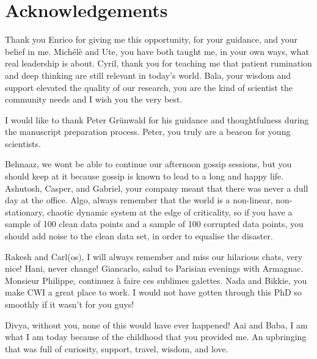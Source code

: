\chapter*{Acknowledgements}\label{chapter:preface}

Thank you Enrico for giving me this opportunity, for your guidance, and your 
belief in me. Mich\'el\`e and Ute, you have both taught me, in your own ways, 
what real leadership is about. Cyril, thank you for teaching me that patient 
rumination and deep thinking are still relevant in today's world. Bala, 
your wisdom and support elevated the quality of our research, you are 
the kind of scientist the community needs and I wish you the very best.

I would like to thank Peter Gr\"{u}nwald for his guidance and thoughtfulness 
during the manuscript preparation process. Peter, you truly are a beacon for 
young scientists. 

Behnaaz, we wont be able to continue our afternoon gossip sessions, but you 
should keep at it because gossip is known to lead to a long and happy life. 
Ashutosh, Casper, and Gabriel, your company meant that there was never a dull 
day at the office. Algo, always remember that the world is a non-linear, 
non-stationary, chaotic dynamic system at the edge of criticality, so if 
you have a sample of 100 clean data points and a sample of 100 corrupted data 
points, you should add noise to the clean data set, in order to equalise the 
disaster.

Rakesh and Carl(os), I will always remember and miss our hilarious chats, very 
nice! Hani, never change! Giancarlo, salud to Parisian evenings with Armagnac. 
Monsieur Philippe, continuez \`a faire ces sublimes galettes.
%
Nada and Bikkie, you make CWI a great place to work. I would not have gotten 
through this PhD so smoothly if it wasn't for you guys!  

Divya, without you, none of this would have ever happened!
%
Aai and Baba, I am what I am today because of the childhood that you provided 
me. An upbringing that was full of curiosity, support, travel, wisdom, and love.
